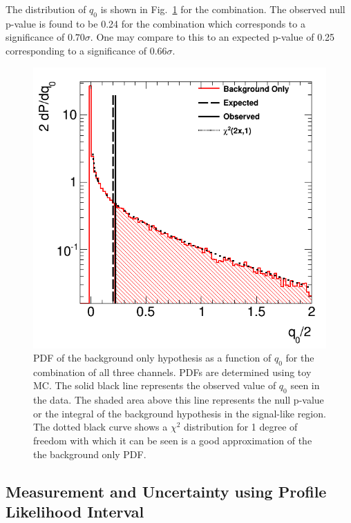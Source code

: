 The distribution of $q_0$ is 
shown in Fig.~\ref{fig:stat_measurement_significance} for the combination.  
The observed null p-value 
is found to be 0.24 for the combination which corresponds to a significance
of $0.70 \sigma$.  One may compare to this to an expected 
p-value of 0.25 corresponding to 
a significance of $0.66 \sigma$.

\begin{figure}[ht!]
\centering
\includegraphics[width=0.50\columnwidth]{figures/statistics/significance/combination.png}
\caption{PDF of the background only hypothesis as a function of $q_0$ for 
the combination of all three channels. PDFs are determined 
using toy MC. The solid black line represents the observed 
value of $q_0$ seen in the data. The shaded area above
this line represents the null p-value or the 
integral of the background hypothesis in the signal-like region.
The dotted black curve shows a $\chi^2$ distribution for 1 degree of 
freedom with which 
it can be seen is a good approximation of the 
the background only PDF.}
\label{fig:stat_measurement_significance}
\end{figure}


\subsection{Measurement and Uncertainty using Profile Likelihood Interval}

